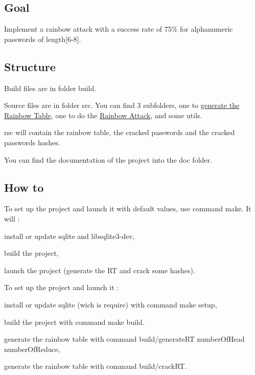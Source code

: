 \subsection*{Goal}

Implement a rainbow attack with a success rate of 75\% for alphanumeric passwords of length\mbox{[}6-\/8\mbox{]}.

\subsection*{Structure}

Build files are in folder {\ttfamily build}.

Source files are in folder {\ttfamily src}. You can find 3 subfolders, one to \hyperlink{namespacebe_1_1esi_1_1secl_1_1pn_af8b773cad93b0eb78b89f69721e4bb1d}{generate the Rainbow Table}, one to do the \hyperlink{namespacebe_1_1esi_1_1secl_1_1pn_aad832fb30fa4cc9e74d15d7129d0c929}{Rainbow Attack}, and some utils.

{\ttfamily rsc} will contain the rainbow table, the cracked passwords and the cracked passwords hashes.

You can find the documentation of the project into the {\ttfamily doc} folder.

\subsection*{How to}

To set up the project and launch it with default values, use command {\ttfamily make}. It will \+:
\begin{DoxyItemize}
\item install or update {\ttfamily sqlite} and {\ttfamily libsqlite3-\/dev},
\item build the project,
\item launch the project (generate the RT and crack some hashes).
\end{DoxyItemize}

To set up the project and launch it \+:
\begin{DoxyItemize}
\item install or update sqlite (wich is require) with command {\ttfamily make setup},
\item build the project with command {\ttfamily make build}.
\item generate the rainbow table with command {\ttfamily build/generate\+RT number\+Of\+Head number\+Of\+Reduce},
\item generate the rainbow table with command {\ttfamily build/crack\+RT}.
\end{DoxyItemize}

